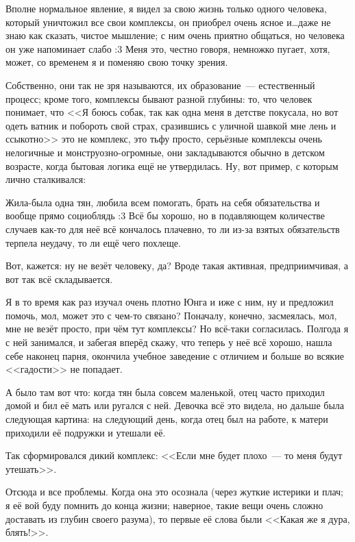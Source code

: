 \documentclass[a4paper,14pt,oneside]{memoir}
\begin{document}
\medskip

Вполне нормальное явление, я видел за свою жизнь только одного человека, который уничтожил все свои комплексы, он приобрел очень ясное и\ldots даже не знаю как сказать, чистое мышление; с ним очень приятно общаться, но человека он уже напоминает слабо :3 Меня это, честно говоря, немножко пугает, хотя, может, со временем я и поменяю свою точку зрения. 

Собственно, они так не зря называются, их образование~--- естественный процесс; кроме того, комплексы бывают разной глубины: то, что человек понимает, что <<Я боюсь собак, так как одна меня в детстве покусала, но вот одеть ватник и побороть свой страх, сразившись с уличной шавкой мне лень и ссыкотно>> это не комплекс, это тьфу просто, серьёзные комплексы очень нелогичные и монструозно-огромные, они закладываются обычно в детском возрасте, когда бытовая логика ещё не утвердилась. Ну, вот пример, с которым лично сталкивался:

Жила-была одна тян, любила всем помогать, брать на себя обязательства и вообще прямо социоблядь :3 Всё бы хорошо, но в подавляющем количестве случаев как-то для неё всё кончалось плачевно, то ли из-за взятых обязательств терпела неудачу, то ли ещё чего похлеще.

Вот, кажется: ну не везёт человеку, да? Вроде такая активная, предприимчивая, а вот так всё складывается.
 
Я в то время как раз изучал очень плотно Юнга и иже с ним, ну и предложил помочь, мол, может это с чем-то связано? Поначалу, конечно, засмеялась, мол, мне не везёт просто, при чём тут комплексы? Но всё-таки согласилась. Полгода я с ней занимался, и забегая вперёд скажу, что теперь у неё всё хорошо, нашла себе наконец парня, окончила учебное заведение с отличием и больше во всякие <<гадости>> не попадает. 

А было там вот что: когда тян была совсем маленькой, отец часто приходил домой и бил её мать или ругался с ней. Девочка всё это видела, но дальше была следующая картина: на следующий день, когда отец был на работе, к матери приходили её подружки и утешали её.
 
Так сформировался дикий комплекс: <<Если мне будет плохо~--- то меня будут утешать>>.
 
Отсюда и все проблемы. Когда она это осознала (через жуткие истерики и плач; я её вой буду помнить до конца жизни; наверное, такие вещи очень сложно доставать из глубин своего разума), то первые её слова были <<Какая же я дура, блять!>>.
 
\end{document}
